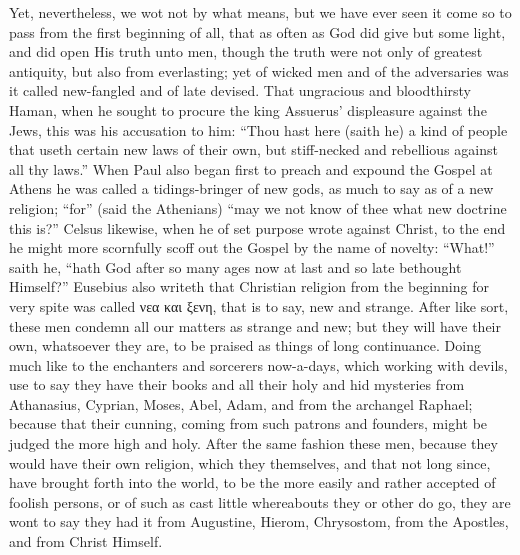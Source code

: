Yet, nevertheless, we wot not by what means, but we have ever seen
it come so to pass from the first beginning of all, that as often as
God did give but some light, and did open His truth unto men, though
the truth were not only of greatest antiquity, but also from everlasting;
yet of wicked men and of the adversaries was it called new-fangled and
of late devised. That ungracious and bloodthirsty Haman, when
he sought to procure the king Assuerus’ displeasure against the
Jews, this was his accusation to him: “Thou hast here (saith he)
a kind of people that useth certain new laws of their own, but stiff-necked
and rebellious against all thy laws.” When Paul also began
first to preach and expound the Gospel at Athens he was called a tidings-bringer
of new gods, as much to say as of a new religion; “for”
(said the Athenians) “may we not know of thee what new doctrine
this is?” Celsus likewise, when he of set purpose wrote
against Christ, to the end he might more scornfully scoff out the Gospel
by the name of novelty: “What!” saith he, “hath God
after so many ages now at last and so late bethought Himself?”
Eusebius also writeth that Christian religion from the beginning for
very spite was called νεα και ξενη,
that is to say, new and strange. After like sort, these men condemn
all our matters as strange and new; but they will have their own, whatsoever
they are, to be praised as things of long continuance. Doing much
like to the enchanters and sorcerers now-a-days, which working with
devils, use to say they have
their books and all their holy and hid mysteries from Athanasius, Cyprian,
Moses, Abel, Adam, and from the archangel Raphael; because that their
cunning, coming from such patrons and founders, might be judged the
more high and holy. After the same fashion these men, because
they would have their own religion, which they themselves, and that
not long since, have brought forth into the world, to be the more easily
and rather accepted of foolish persons, or of such as cast little whereabouts
they or other do go, they are wont to say they had it from Augustine,
Hierom, Chrysostom, from the Apostles, and from Christ Himself.

